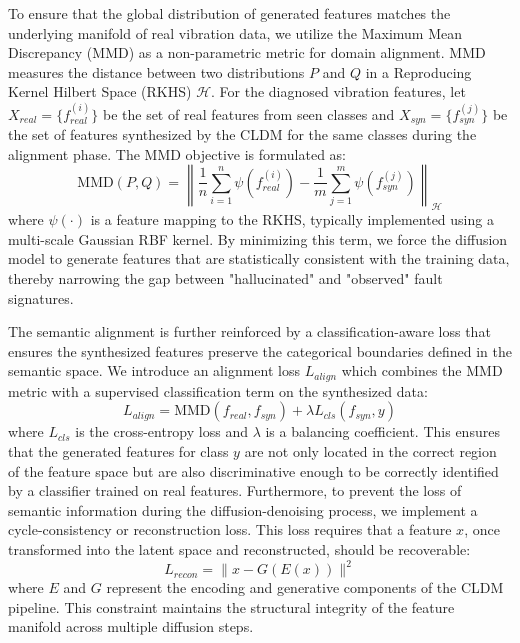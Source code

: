 \documentclass[journal]{IEEEtran}
\begin{document}
To ensure that the global distribution of generated features matches the underlying manifold of real vibration data, we utilize the Maximum Mean Discrepancy (MMD) \cite{Gretton2012MMD} as a non-parametric metric for domain alignment. MMD measures the distance between two distributions $P$ and $Q$ in a Reproducing Kernel Hilbert Space (RKHS) $\mathcal{H}$. For the diagnosed vibration features, let $X_{real} = \{f_{real}^{(i)}\}$ be the set of real features from seen classes and $X_{syn} = \{f_{syn}^{(j)}\}$ be the set of features synthesized by the CLDM for the same classes during the alignment phase. The MMD objective is formulated as:
\begin{equation}
\text{MMD}(P, Q) = \left\| \frac{1}{n} \sum_{i=1}^n \psi(f_{real}^{(i)}) - \frac{1}{m} \sum_{j=1}^m \psi(f_{syn}^{(j)}) \right\|_{\mathcal{H}}
\end{equation}
where $\psi(\cdot)$ is a feature mapping to the RKHS, typically implemented using a multi-scale Gaussian RBF kernel. By minimizing this term, we force the diffusion model to generate features that are statistically consistent with the training data, thereby narrowing the gap between "hallucinated" and "observed" fault signatures.

The semantic alignment is further reinforced by a classification-aware loss that ensures the synthesized features preserve the categorical boundaries defined in the semantic space. We introduce an alignment loss $L_{align}$ which combines the MMD metric with a supervised classification term on the synthesized data:
\begin{equation}
L_{align} = \text{MMD}(f_{real}, f_{syn}) + \lambda L_{cls}(f_{syn}, y)
\end{equation}
where $L_{cls}$ is the cross-entropy loss and $\lambda$ is a balancing coefficient. This ensures that the generated features for class $y$ are not only located in the correct region of the feature space but are also discriminative enough to be correctly identified by a classifier trained on real features. Furthermore, to prevent the loss of semantic information during the diffusion-denoising process, we implement a cycle-consistency or reconstruction loss. This loss requires that a feature $x$, once transformed into the latent space and reconstructed, should be recoverable:
\begin{equation}
L_{recon} = \|x - G(E(x))\|^2
\end{equation}
where $E$ and $G$ represent the encoding and generative components of the CLDM pipeline. This constraint maintains the structural integrity of the feature manifold across multiple diffusion steps.
\end{document}
